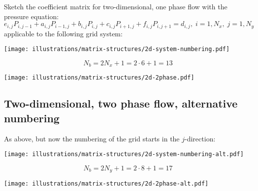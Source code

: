 \begin{question}
  Sketch the coefficient matrix for two-dimensional, one phase flow with the pressure equation:
  \begin{equation}
    \nonumber
    e_{i,j}P_{i,j-1}+a_{i,j}P_{i-1,j}+b_{i,j}P_{i,j}+c_{i,j}P_{i+1,j}+f_{i,j}P_{i,j+1}=d_{i,j},\; i=1,N_{x},\; j=1,N_{y}
  \end{equation}
  applicable to the following grid system:

  \begin{center}
    \texttt{[image: illustrations/matrix-structures/2d-system-numbering.pdf]}
  \end{center}
\end{question}

\begin{equation}
  N_b = 2N_x + 1 = 2\cdot 6 + 1 = 13 \nonumber
\end{equation}

\begin{center}
  \texttt{[image: illustrations/matrix-structures/2d-2phase.pdf]}
\end{center}


\subsection{Two-dimensional, two phase flow, alternative numbering} %
\label{sub:two_dimensional_two_phase_flow_alternative_numbering}

\begin{question}
  As above, but now the numbering of the grid starts in the $j$-direction:

  \begin{center}
    \texttt{[image: illustrations/matrix-structures/2d-system-numbering-alt.pdf]}
  \end{center}
\end{question}

\begin{equation}
  N_b = 2N_y+1 = 2\cdot 8 + 1 = 17 \nonumber
\end{equation}

\begin{center}
  \texttt{[image: illustrations/matrix-structures/2d-2phase-alt.pdf]}
\end{center}


